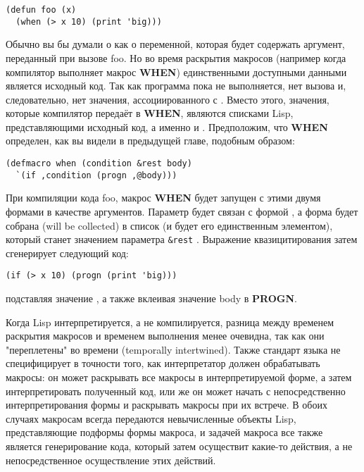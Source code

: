 \begin{lstlisting}
(defun foo (x)
  (when (> x 10) (print 'big)))
\end{lstlisting}

Обычно вы бы думали о  как о переменной, которая будет содержать аргумент,
переданный при вызове foo. Но во время раскрытия макросов (например когда компилятор
выполняет макрос \textbf{WHEN}) единственными доступными данными является исходный
код. Так как программа пока не выполняется, нет вызова  и, следовательно, нет
значения, ассоциированного с . Вместо этого, значения, которые компилятор передаёт
в \textbf{WHEN}, являются списками Lisp, представляющими исходный код, а именно  и . Предположим, что \textbf{WHEN} определен, как вы видели в
предыдущей главе, подобным образом:

\begin{lstlisting}
(defmacro when (condition &rest body)
  `(if ,condition (progn ,@body)))
\end{lstlisting}

При компиляции кода foo, макрос \textbf{WHEN} будет запущен с этими двумя формами в
качестве аргументов. Параметр  будет связан с формой , а
форма  будет собрана (will be collected) в список (и будет его
единственным элементом), который станет значением параметра \lstinline!&rest!
. Выражение квазицитирования затем сгенерирует следующий код:

\begin{lstlisting}
(if (> x 10) (progn (print 'big)))
\end{lstlisting}

подставляя значение , а также вклеивая значение body в \textbf{PROGN}.

Когда Lisp интерпретируется, а не компилируется, разница между временем раскрытия макросов и временем выполнения менее очевидна, так как они "переплетены" во времени (temporally intertwined). Также стандарт языка не специфицирует в точности того, как интерпретатор должен обрабатывать макросы: он может раскрывать все макросы в интерпретируемой форме, а затем интерпретировать полученный код, или же он может начать с непосредственно интерпретирования формы и раскрывать макросы при их встрече. В обоих случаях макросам всегда передаются невычисленные объекты Lisp, представляющие подформы формы макроса, и задачей макроса все также является генерирование кода, который затем осуществит какие-то действия, а не непосредственное осуществление этих действий.

